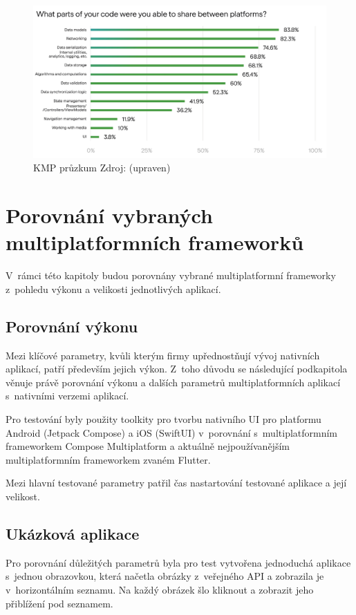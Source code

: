 \begin{figure}[H]
  \centering
  \includegraphics[width=1\textwidth]{survey-results-q1-q2-22-light.jpg}
  \caption{KMP průzkum Zdroj: \cite{imgSurvey} (upraven)}
  \label{fig:KMPSurvey}
\end{figure}

\section{Porovnání vybraných multiplatformních frameworků}

V~rámci této kapitoly budou porovnány vybrané multiplatformní frameworky z~pohledu výkonu a velikosti jednotlivých aplikací.


\subsection{Porovnání výkonu} \label{performanceSection}

Mezi klíčové parametry, kvůli kterým firmy upřednostňují vývoj nativních aplikací, patří především jejich výkon. Z~toho důvodu se následující podkapitola věnuje právě porovnání výkonu a dalších parametrů multiplatformních aplikací
s~nativními verzemi aplikací. 

Pro testování byly použity toolkity pro tvorbu nativního UI pro platformu Android (Jetpack Compose) a iOS (SwiftUI)
v~porovnání s~multiplatformním frameworkem Compose Multiplatform a aktuálně nejpoužívanějším multiplatformním
frameworkem zvaném Flutter. \cite{crossPlatformFrameworksStats} 

Mezi hlavní testované parametry patřil čas nastartování testované aplikace a její velikost.

\subsection*{Ukázková aplikace}
Pro porovnání důležitých parametrů byla pro test vytvořena jednoduchá aplikace s~jednou obrazovkou, která 
načetla obrázky z~veřejného API a zobrazila je v~horizontálním seznamu. 
Na každý obrázek šlo kliknout a zobrazit jeho přiblížení pod seznamem. 

